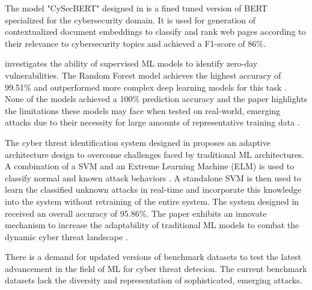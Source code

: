 \documentclass[letterpaper,twocolumn,fleqn]{article}
\begin{document}
The model "CySecBERT" designed in \cite{kuehnThreatCrawlBERTbasedFocused2023} is a fined tuned version of BERT specialized for the cybersecurity domain.
It is used for generation of contextualized document embeddings to classify and rank web pages according to their relevance to cybersecurity topics and achieved a F1-score of 86\%\cite{kuehnThreatCrawlBERTbasedFocused2023}. 

\cite{abriPerformanceMachineDeep2019} investigates the ability of supervised ML models to identify zero-day vulnerabilities. The Random Forest model achieves the highest accuracy of 99.51\% and outperformed more complex deep learning models for this task \cite{abriPerformanceMachineDeep2019}.
None of the models achieved a 100\% prediction accuracy and the paper highlights the limitations these models may face when tested on real-world, emerging attacks due to their necessity for large amounts of representative training data \cite{abriPerformanceMachineDeep2019}. 

The cyber threat identification system designed in \cite{al-yaseenRealtimeMultiagentSystem2017} proposes an adaptive architecture design to overcome challenges faced by traditional ML architectures. 
A combination of a SVM and an Extreme Learning Machine (ELM) is used to classify normal and known attack behaviors \cite{al-yaseenRealtimeMultiagentSystem2017} . A standalone SVM is then used to learn the classified unknown attacks in real-time and incorporate this knowledge into the system without retraining of the entire system\cite{al-yaseenRealtimeMultiagentSystem2017}. 
The system designed in \cite{al-yaseenRealtimeMultiagentSystem2017} received an overall accuracy of 95.86\%. The paper exhibits an innovate mechanism to increase the adaptability of traditional ML models to combat the dynamic cyber threat landscape\cite{al-yaseenRealtimeMultiagentSystem2017} . 

There is a demand for updated versions of benchmark datasets to test the latest advancement in the field of ML for cyber threat detecion. The current benchmark datasets lack the diversity and representation of sophisticated, emerging attacks.
\end{document}
